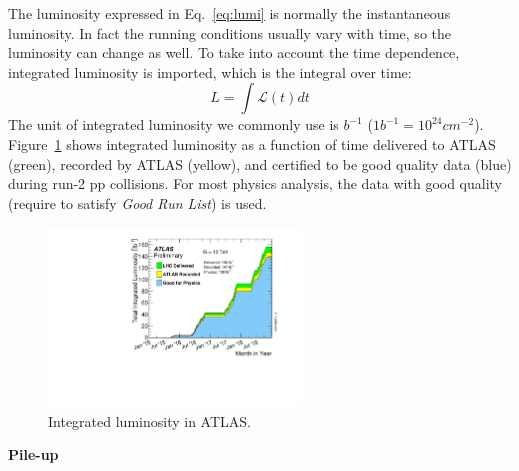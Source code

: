 The luminosity expressed in Eq.~\ref{eq:lumi} is normally the instantaneous luminosity.
In fact the running conditions usually vary with time, so the luminosity can change as well.
To take into account the time dependence, integrated luminosity is imported,
which is the integral over time:
\begin{equation}
	L = \int \mathcal{L}(t) dt
\end{equation}
The unit of integrated luminosity we commonly use is $b^{-1}$ ($1 b^{-1} = 10^{24} cm^{-2}$).
Figure~\ref{fig:lumi_vs_time} shows integrated luminosity as a function of time delivered to ATLAS (green), 
recorded by ATLAS (yellow), and certified to be good quality data (blue) during run-2 pp collisions.
For most physics analysis, the data with good quality (require to satisfy \textit{Good Run List}) is used.
\begin{figure}[!htb]
  \centering
  \includegraphics[width=0.6\textwidth]{figures/Detector/intlumivstimeRun2DQall.pdf}
  \caption{Integrated luminosity in ATLAS.}
  \label{fig:lumi_vs_time}
\end{figure}

\textbf{Pile-up}

